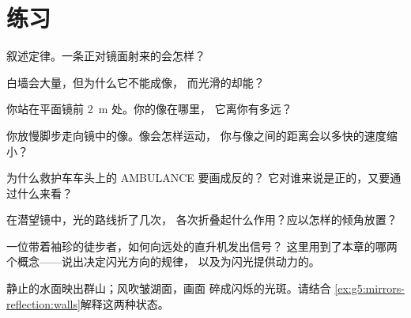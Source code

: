 \section{练习}

\begin{exercise}[$\star$]\label{exo:g5:mirrors-reflection:1}
叙述定律。一条正对镜面射来的会怎样？
\end{exercise}

\begin{exercise}[$\star$]\label{exo:g5:mirrors-reflection:2}
白墙会大量，但为什么它不能成像，
而光滑的却能？
\end{exercise}

\begin{exercise}[$\star$]\label{exo:g5:mirrors-reflection:3}
你站在平面镜前 \qty{2}{m} 处。你的像在哪里，
它离你有多远？
\end{exercise}

\begin{exercise}[$\star$]\label{exo:g5:mirrors-reflection:4}
你放慢脚步走向镜中的像。像会怎样运动，
你与像之间的距离会以多快的速度缩小？
\end{exercise}

\begin{exercise}[$\star$]\label{exo:g5:mirrors-reflection:5}
为什么救护车车头上的 AMBULANCE 要画成反的？
它对谁来说是正的，又要通过什么来看？
\end{exercise}

\begin{exercise}[$\star$]\label{exo:g5:mirrors-reflection:6}
在潜望镜中，光的路线折了几次，
各次折叠起什么作用？应以怎样的倾角放置？
\end{exercise}

\begin{exercise}[$\star$]\label{exo:g5:mirrors-reflection:7}
一位带着袖珍的徒步者，如何向远处的直升机发出信号？
这里用到了本章的哪两个概念——说出决定闪光方向的规律，
以及为闪光提供动力的。
\end{exercise}

\begin{exercise}[$\star$]\label{exo:g5:mirrors-reflection:8}
静止的水面映出群山；风吹皱湖面，画面
碎成闪烁的光斑。请结合
\cref{ex:g5:mirrors-reflection:walls}解释这两种状态。
\end{exercise}

